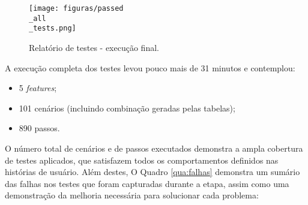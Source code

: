 \begin{figure}[H]
\centering
\texttt{[image: figuras/passed\\\_all\\\_tests.png]}
\caption{Relatório de testes - execução final.}
\label{fig:resultado-terminal}
\end{figure}

A execução completa dos testes levou pouco mais de 31 minutos e contemplou:

\begin{itemize}
    \item 5 \textit{features};
    \item 101 cenários (incluindo combinação geradas pelas tabelas);
    \item 890 passos.
\end{itemize}

O número total de cenários e de passos executados demonstra a ampla cobertura de testes aplicados, que satisfazem todos os comportamentos definidos nas 
histórias de usuário. Além destes, O Quadro \ref{qua:falhas} demonstra um sumário das falhas nos testes que foram capturadas durante a etapa, assim como 
uma demonstração da melhoria necessária para solucionar cada problema:

